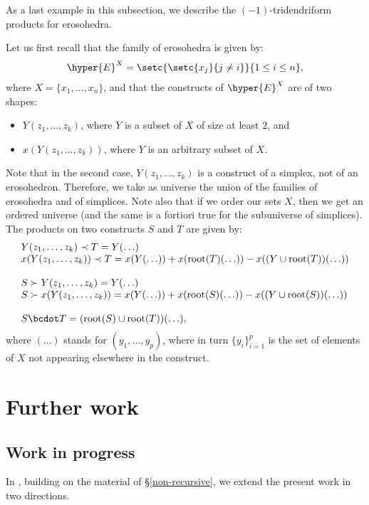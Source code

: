 As a last example in this subsection, we describe the $(-1)$-tridendriform products for erosohedra.
\begin{example} \label{eroso2}
Let us first recall that the family of erosohedra is given by:
\begin{align*}
 \hyper{E}^X=\setc{\setc{x_j}{j \neq i}}{1\leq i\leq n},
\end{align*} 
where $X=\{x_1, \ldots, x_n\}$,
and that the constructs of $\hyper{E}^X$ are of two shapes:
\begin{itemize}
\item $Y(z_1, \ldots, z_k)$, where $Y$ is a subset of $X$ of size at least $2$, and 
\item $x(Y(z_1, \ldots, z_k))$, where   $Y$ is an arbitrary subset of $X$. 
\end{itemize}
 Note that in the second case, $Y(z_1, \ldots, z_k)$ is a construct of a simplex, not of an erosohedron.  Therefore, we take as universe the union of the families of erosohedra and of simplices. Note also that if we order our sets $X$, then we get an ordered universe (and the same is a fortiori true for the subuniverse of simplices).
The products on two constructs $S$ and $T$ are given by:
$$\begin{array}{llllll}
Y(z_1, \ldots, z_k) \prec T = Y(\ldots) \\
x(Y(z_1, \ldots, z_k)) \prec T = x(Y(\ldots)) + x(\mbox{root}(T)(\ldots)) - x((Y \cup \mbox{root}(T))(\ldots))\\\\
S \succ Y(z_1, \ldots, z_k) = Y(\ldots) \\
S \succ x(Y(z_1, \ldots, z_k)) = x(Y(\ldots)) + x(\mbox{root}(S)(\ldots)) - x((Y \cup \mbox{root}(S))(\ldots))\\\\
S \bcdot T = (\mbox{root}(S) \cup \mbox{root}(T))(\ldots),
\end{array}$$
where $(\ldots)$ stands for $(y_1, \ldots, y_p)$, where in turn $\{y_i\}_{i=1}^p$ is the set of elements of $X$ not appearing elsewhere in the construct.\demo
\end{example}

\section{Further work}

\subsection*{Work in progress} \label{work-in-progress}
In \cite{RSON}, building on the material of \S\ref{non-recursive}, we extend the present work in two directions.

